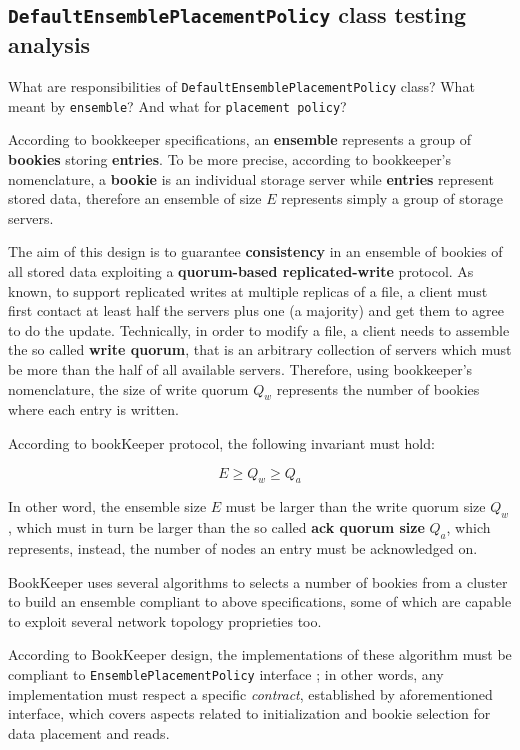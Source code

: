 \documentclass[sigconf]{acmart}
\begin{document}
\subsection{\texttt{DefaultEnsemblePlacementPolicy} class testing analysis}

What are responsibilities of \texttt{DefaultEnsemblePlacementPolicy} class? What meant by \texttt{ensemble}? And what for \texttt{placement policy}?

According to bookkeeper specifications\cite{BookKeeperArchitecture}, an \textbf{ensemble} represents a group of \textbf{bookies} storing \textbf{entries}. To be more precise, according to bookkeeper's nomenclature, a \textbf{bookie} is an individual storage server while \textbf{entries} represent stored data, therefore an ensemble of size $E$ represents simply a group of storage servers.

The aim of this design is to guarantee \textbf{consistency} in an ensemble of bookies of all stored data exploiting a \textbf{quorum-based replicated-write} protocol. As known, to support replicated writes at multiple replicas of a file, a client must first contact at least half the servers plus one (a majority) and get them to agree to do the update\cite{Tanenbaum}. Technically, in order to modify a file, a client needs to assemble the so called \textbf{write quorum}, that is an arbitrary collection of servers which must be more than the half of all available servers\cite{Tanenbaum}. Therefore, using bookkeeper's nomenclature, the size of write quorum $Q_w$ represents the number of bookies where each entry is written. 

According to bookKeeper protocol\cite{BookKeeperProtocol}, the following invariant must hold:

\begin{equation}
E \geqslant Q_w \geqslant Q_a
\end{equation}

In other word, the ensemble size $E$ must be larger than the write quorum size $Q_w$, which must in turn be larger than the so called \textbf{ack quorum size} $Q_a$, which represents, instead, the number of nodes an entry must be acknowledged on. 

BookKeeper uses several algorithms to selects a number of bookies from a cluster to build an ensemble compliant to above specifications, some of which are capable to exploit several network topology proprieties too. 

According to BookKeeper design, the implementations of these algorithm must be compliant to \texttt{EnsemblePlacementPolicy} interface \cite{EnsemblePlacementPolicy}; in other words, any implementation must respect a specific \textit{contract}, established by aforementioned interface, which covers aspects related to initialization and bookie selection for data placement and reads\cite{EnsemblePlacementPolicy}. 
\end{document}
